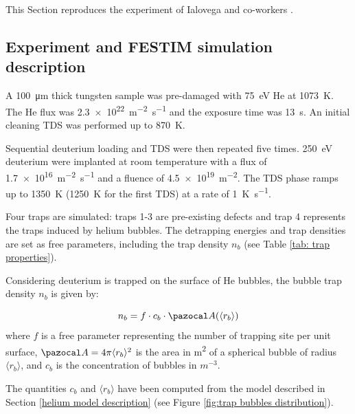 This Section reproduces the experiment of Ialovega and co-workers .

\subsection{Experiment and FESTIM simulation description}

A \SI{100}{\micro\metre} thick tungsten sample was pre-damaged with \SI{75}{eV} He at \SI{1073}{K}.
The He flux was \SI{2.3e22}{m^{-2}.s^{-1}} and the exposure time was \SI{13}{s}.
An initial cleaning TDS was performed up to \SI{870}{K}.

Sequential deuterium loading and TDS were then repeated five times.
\SI{250}{eV} deuterium were implanted at room temperature with a flux of \SI{1.7e16}{m^{-2}.s^{-1}} and a fluence of \SI{4.5e19}{m^{-2}}.
The TDS phase ramps up to \SI{1350}{K} (\SI{1250}{K} for the first TDS) at a rate of \SI{1}{K.s^{-1}}.

Four traps are simulated: traps 1-3 are pre-existing defects and trap 4 represents the traps induced by helium bubbles.
The detrapping energies and trap densities are set as free parameters, including the trap density $n_b$ (see Table \ref{tab: trap properties}).

Considering deuterium is trapped on the surface of He bubbles, the bubble trap density $n_b$ is given by:

\begin{equation}
    n_b = f \cdot c_b \cdot \Ab(\langle r_b \rangle)
\end{equation}
where $f$ is a free parameter representing the number of trapping site per unit surface, $\Ab = 4\pi \langle r_b \rangle^2$ is the area in \si{m^2} of a spherical bubble of radius $\langle r_b \rangle$, and $c_b$ is the concentration of bubbles in $\si{m^{-3}}$.

The quantities $c_b$ and $\langle r_b \rangle$ have been computed from the model described in Section \ref{helium model description} (see Figure \ref{fig:trap bubbles distribution}).

